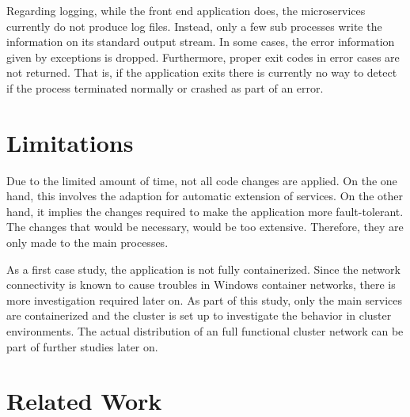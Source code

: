 Regarding logging, while the front end application does, the microservices currently do not produce log files. Instead, only a few sub processes write the information on its standard output stream. In some cases, the error information given by exceptions is dropped.
Furthermore, proper exit codes in error cases are not returned. That is, if the application exits there is currently no way to detect if the process terminated normally or crashed as part of an error.

\section{Limitations}
Due to the limited amount of time, not all code changes are applied. On the one hand, this involves the adaption for automatic extension of services. On the other hand, it implies the changes required to make the application more fault-tolerant. The changes that would be necessary, would be too extensive. Therefore, they are only made to the main processes.

As a first case study, the application is not fully containerized. Since the network connectivity is known to cause troubles in \ac{Windows} container networks, there is more investigation required later on. As part of this study, only the main services are containerized and the cluster is set up to investigate the behavior in cluster environments. The actual distribution of an full functional cluster network can be part of further studies later on.

\section{Related Work}
